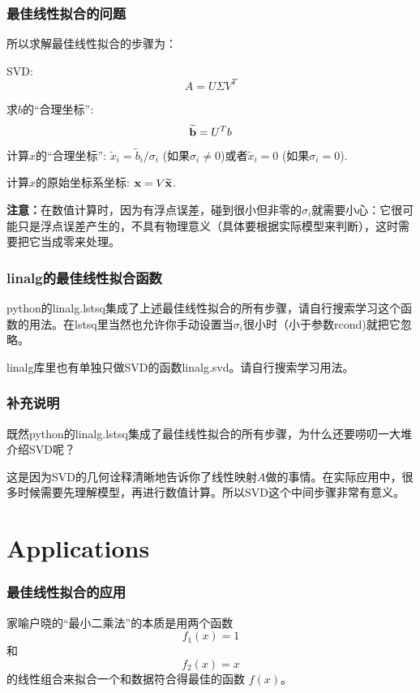\documentclass[CJK]{beamer}
\begin{document}
    
    
    



    \begin{frame}
      \frametitle{最佳线性拟合的问题}
      所以求解最佳线性拟合的步骤为：
      \bitem
      \item{SVD: $$A = U\Sigma V^T$$ }
      \item{求$b$的“合理坐标”: $$ \widetilde{{\mathbf{b}}} = U^Tb $$}
      \item{计算$x$的“合理坐标”: $\widetilde{x}_i = \widetilde{b}_i/\sigma_i$ (如果$\sigma_i \ne 0$)或者$\widetilde{x}_i=0$ (如果$\sigma_i=0$).}
      \item{计算$x$的原始坐标系坐标: ${\mathbf{x}}  = V \widetilde{{\mathbf{x}}}$.}
        \eitem

        \skipline
        
        {\bf 注意：}在数值计算时，因为有浮点误差，碰到很小但非零的$\sigma_i$就需要小心：它很可能只是浮点误差产生的，不具有物理意义（具体要根据实际模型来判断），这时需要把它当成零来处理。
    \end{frame}


    \begin{frame}
      \frametitle{linalg的最佳线性拟合函数}
      python的linalg.lstsq集成了上述最佳线性拟合的所有步骤，请自行搜索学习这个函数的用法。在lstsq里当然也允许你手动设置当$\sigma_i$很小时（小于参数rcond)就把它忽略。

      \skipline

      linalg库里也有单独只做SVD的函数linalg.svd。请自行搜索学习用法。
      
    \end{frame}


    \begin{frame}
      \frametitle{补充说明}
      既然python的linalg.lstsq集成了最佳线性拟合的所有步骤，为什么还要唠叨一大堆介绍SVD呢？

      \skiplines
      
      这是因为SVD的几何诠释清晰地告诉你了线性映射$A$做的事情。在实际应用中，很多时候需要先理解模型，再进行数值计算。所以SVD这个中间步骤非常有意义。
      
    \end{frame}

    \section{Applications}
    
    \begin{frame}
      \frametitle{最佳线性拟合的应用}
      家喻户晓的“最小二乘法”的本质是用两个函数
      $$f_1(x) = 1$$
      和
      $$f_2(x) = x$$
      的线性组合来拟合一个和数据符合得最佳的函数 $f(x) $。
    \end{frame}
\end{document}
